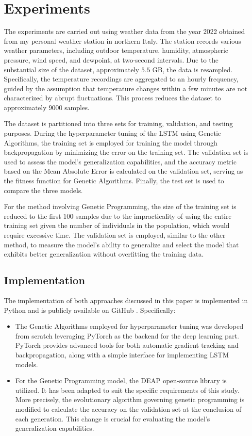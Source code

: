 \section{Experiments}

The experiments are carried out using weather data from the year 2022 obtained from my personal weather station in northern Italy\cite{dataset}. The station records various weather parameters, including outdoor temperature, humidity, atmospheric pressure, wind speed, and dewpoint, at two-second intervals. Due to the substantial size of the dataset, approximately $5.5$ GB, the data is resampled. Specifically, the temperature recordings are aggregated to an hourly frequency, guided by the assumption that temperature changes within a few minutes are not characterized by abrupt fluctuations. This process reduces the dataset to approximately $9000$ samples. 

The dataset is partitioned into three sets for training, validation, and testing purposes. During the hyperparameter tuning of the LSTM using Genetic Algorithms, the training set is employed for training the model through backpropagation by minimizing the error on the training set. The validation set is used to assess the model's generalization capabilities, and the accuracy metric based on the Mean Absolute Error is calculated on the validation set, serving as the fitness function for Genetic Algorithms. Finally, the test set is used to compare the three models.

For the method involving Genetic Programming, the size of the training set is reduced to the first $100$ samples due to the impracticality of using the entire training set given the number of individuals in the population, which would require excessive time. The validation set is employed, similar to the other method, to measure the model's ability to generalize and select the model that exhibits better generalization without overfitting the training data.


\subsection{Implementation}

The implementation of both approaches discussed in this paper is implemented in Python and is publicly available on GitHub \cite{github-repo}. Specifically:
\begin{itemize}
    \item The Genetic Algorithms employed for hyperparameter tuning was developed from scratch leveraging PyTorch\cite{pytorch} as the backend for the deep learning part. PyTorch provides advanced tools for both automatic gradient tracking and backpropagation, along with a simple interface for implementing LSTM models.
    \item For the Genetic Programming model, the DEAP\cite{deap} open-source library is utilized. It has been adapted to suit the specific requirements of this study. More precisely, the evolutionary algorithm governing genetic programming is modified to calculate the accuracy on the validation set at the conclusion of each generation. This change is crucial for evaluating the model's generalization capabilities.
\end{itemize}


